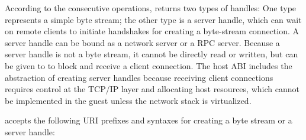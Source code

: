 According to the consecutive operations, 
returns two types of handles: One type represents a simple byte stream;
the other type is a server handle, which can wait on remote clients to initiate handshakes
for creating a byte-stream connection.
A server handle can be bound as a network server or a RPC server.
Because a server handle is not a byte stream, it cannot be directly read or written,
but can be given to  to block and receive a client connection.
The host ABI includes the abstraction of creating server handles
because receiving client connections requires control at the TCP/IP layer
and allocating host resources,
which cannot be implemented in the guest unless
the network stack is virtualized.




 accepts the following URI prefixes and syntaxes for creating a byte stream or a server handle:


